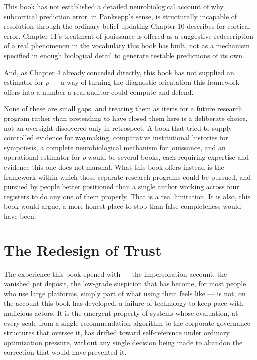 \documentclass[12pt,a4paper]{book}
\begin{document}
This book has not established a detailed neurobiological account of why subcortical prediction error, in Panksepp's sense, is structurally incapable of resolution through the ordinary belief-updating Chapter 10 describes for cortical error. Chapter 11's treatment of jouissance is offered as a suggestive redescription of a real phenomenon in the vocabulary this book has built, not as a mechanism specified in enough biological detail to generate testable predictions of its own.

And, as Chapter 4 already conceded directly, this book has not supplied an estimator for $\rho$ — a way of turning the diagnostic orientation this framework offers into a number a real auditor could compute and defend.

None of these are small gaps, and treating them as items for a future research program rather than pretending to have closed them here is a deliberate choice, not an oversight discovered only in retrospect. A book that tried to supply controlled evidence for waymaking, comparative institutional histories for sympoiesis, a complete neurobiological mechanism for jouissance, and an operational estimator for $\rho$ would be several books, each requiring expertise and evidence this one does not marshal. What this book offers instead is the framework within which those separate research programs could be pursued, and pursued by people better positioned than a single author working across four registers to do any one of them properly. That is a real limitation. It is also, this book would argue, a more honest place to stop than false completeness would have been.

\section{The Redesign of Trust}

The experience this book opened with — the impersonation account, the vanished pet deposit, the low-grade suspicion that has become, for most people who use large platforms, simply part of what using them feels like — is not, on the account this book has developed, a failure of technology to keep pace with malicious actors. It is the emergent property of systems whose evaluation, at every scale from a single recommendation algorithm to the corporate governance structures that oversee it, has drifted toward self-reference under ordinary optimization pressure, without any single decision being made to abandon the correction that would have prevented it.
\end{document}
